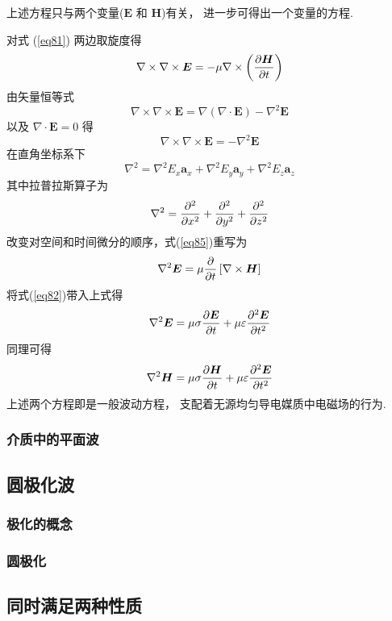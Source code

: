 \documentclass[UTF8,linespread=1.236]{ctexart}
\newcommand\myref[1]{(\ref{#1})}
\newcommand\cu[1]{\boldsymbol{#1}}
\newcommand\vecE{\cu{E}}
\newcommand\vecH{\cu{H}}
\newcommand\pypx[2]{{{\partial {#1}} \over {\partial {#2}}}}
\begin{document}
上述方程只与两个变量($\vecE$ 和 $\vecH$)有关，
进一步可得出一个变量的方程.

对式 \myref{eq81} 两边取旋度得
\begin{equation}\label{eq85}
    \nabla \times \nabla \times \vecE
    =
    - \mu \nabla \times \left( \pypx{\vecH}{t} \right)
\end{equation}
由矢量恒等式
\begin{equation}
    \nabla \times \nabla \times \vecE
    =
    \nabla(\nabla \cdot \vecE)
    -
    \nabla^2\vecE
\end{equation}
以及 $\nabla \cdot \vecE = 0$ 得
\begin{equation}
    \nabla \times \nabla \times \vecE = - \nabla^2\vecE
\end{equation}
在直角坐标系下
\begin{equation}
    \nabla^2 =
    \nabla^2E_x\cu{a}_x +
    \nabla^2E_y\cu{a}_y +
    \nabla^2E_z\cu{a}_z
\end{equation}
其中拉普拉斯算子为
\begin{equation}
    \nabla^2 = \pypx{^2}{x^2} + \pypx{^2}{y^2} + \pypx{^2}{z^2}
\end{equation}
改变对空间和时间微分的顺序，式\myref{eq85}重写为
\begin{equation*}
    \nabla^2\vecE = \mu \pypx{}{t}\left[ \nabla \times \vecH \right]
\end{equation*}
将式\myref{eq82}带入上式得
\begin{equation}
    \nabla^2\vecE = 
    \mu \sigma \pypx{\vecE}{t} + \mu \varepsilon \pypx{^2\vecE}{t^2}
\end{equation}
同理可得
\begin{equation}
    \nabla^2\vecH = 
    \mu \sigma \pypx{\vecH}{t} + \mu \varepsilon \pypx{^2\vecE}{t^2}
\end{equation}
上述两个方程即是一般波动方程，
支配着无源均匀导电媒质中电磁场的行为.

\subsubsection{介质中的平面波}

\subsection{圆极化波}

\subsubsection{极化的概念}

\subsubsection{圆极化}

\subsection{同时满足两种性质}


\end{document}
